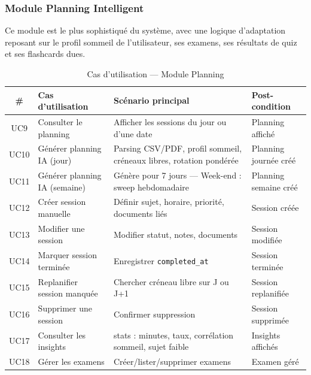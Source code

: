 \documentclass[12pt,a4paper]{report}
\begin{document}
\subsubsection{Module Planning Intelligent}

Ce module est le plus sophistiqué du système, avec une logique d'adaptation reposant sur le profil sommeil de l'utilisateur, ses examens, ses résultats de quiz et ses flashcards dues.

\begin{table}[H]
    \centering
    \caption{Cas d'utilisation — Module Planning}
    \renewcommand{\arraystretch}{1.3}
    \begin{tabular}{|c|p{3.5cm}|p{4.5cm}|p{3.5cm}|}
        \hline
        \textbf{\#} & \textbf{Cas d'utilisation} & \textbf{Scénario principal} & \textbf{Post-condition} \\
        \hline
        UC9  & Consulter le planning & Afficher les sessions du jour ou d'une date & Planning affiché \\
        \hline
        UC10 & Générer planning IA (jour) & Parsing CSV/PDF, profil sommeil, créneaux libres, rotation pondérée & Planning journée créé \\
        \hline
        UC11 & Générer planning IA (semaine) & Génère pour 7 jours — Week-end : sweep hebdomadaire & Planning semaine créé \\
        \hline
        UC12 & Créer session manuelle & Définir sujet, horaire, priorité, documents liés & Session créée \\
        \hline
        UC13 & Modifier une session & Modifier statut, notes, documents & Session modifiée \\
        \hline
        UC14 & Marquer session terminée & Enregistrer \texttt{completed\_at} & Session terminée \\
        \hline
        UC15 & Replanifier session manquée & Chercher créneau libre sur J ou J+1 & Session replanifiée \\
        \hline
        UC16 & Supprimer une session & Confirmer suppression & Session supprimée \\
        \hline
        UC17 & Consulter les insights & stats : minutes, taux, corrélation sommeil, sujet faible & Insights affichés \\
        \hline
        UC18 & Gérer les examens & Créer/lister/supprimer examens & Examen géré \\
        \hline
    \end{tabular}
\end{table}
\end{document}
